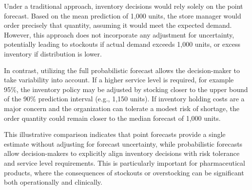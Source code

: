\documentclass[
  authoryear,
  preprint,
  3p]{elsarticle}
\begin{document}
Under a traditional approach, inventory decisions would rely solely on
the point forecast. Based on the mean prediction of 1,000 units, the
store manager would order precisely that quantity, assuming it would
meet the expected demand. However, this approach does not incorporate
any adjustment for uncertainty, potentially leading to stockouts if
actual demand exceeds 1,000 units, or excess inventory if distribution
is lower.

In contrast, utilizing the full probabilistic forecast allows the
decision-maker to take variability into account. If a higher service
level is required, for example 95\%, the inventory policy may be
adjusted by stocking closer to the upper bound of the 90\% prediction
interval (e.g., 1,150 units). If inventory holding costs are a major
concern and the organization can tolerate a modest risk of shortage, the
order quantity could remain closer to the median forecast of 1,000
units.

\begin{table}[H]

\caption{\label{tbl-point_vs_probabilistic}Comparison of ordering
decisions under point and probabilistic forecasts - an illustrative
example.}


\end{table}%

This illustrative comparison indicates that point forecasts provide a
single estimate without adjusting for forecast uncertainty, while
probabilistic forecasts allow decision-makers to explicitly align
inventory decisions with risk tolerance and service level requirements.
This is particularly important for pharmaceutical products, where the
consequences of stockouts or overstocking can be significant both
operationally and clinically.
\end{document}
